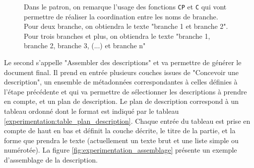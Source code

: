 \begin{figure}[ht]
    \centering
    \caption{Dans le patron, on remarque l'usage des fonctions \texttt{CP} et \texttt{C} qui vont permettre de réaliser la coordination entre les noms de branche. Pour deux branche, on obtiendra le texte "branche 1 et branche 2". Pour trois branches et plus, on obtiendra le texte "branche 1, branche 2, branche 3, (...) et branche n"}
    \label{fig:experimentation_qgis2desc_conception}
\end{figure}

\newpar{}

Le second s'appelle "Assembler des descriptions" et va permettre de générer le document final. Il prend en entrée plusieurs couches issues de "Concevoir une description", un ensemble de métadonnées correspondantes à celles définies à l'étape précédente et qui va permettre de sélectionner les descriptions à prendre en compte, et un plan de description. Le plan de description correspond à un tableau ordonné dont le format est indiqué par le tableau \ref{experimentation:table_plan_description}. Chaque entrée du tableau est prise en compte de haut en bas et définit la couche décrite, le titre de la partie, et la forme que prendra le texte (actuellement un texte brut et une liste simple ou numérotée). La figure \ref{fig:experimentation_assemblage} présente un exemple d'assemblage de la description.

